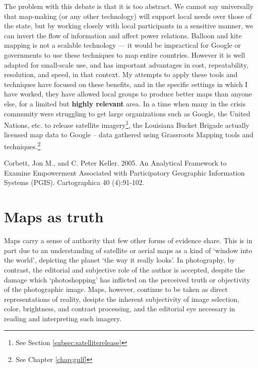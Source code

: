 \documentclass[11pt]{report}
\begin{document}
The problem with this debate is that it is too abstract. We cannot say universally that map-making (or any other technology) will support local needs over those of the state, but by working closely with local participants in a sensitive manner, we can invert the flow of information and affect power relations. Balloon and kite mapping is not a scalable technology --- it would be impractical for Google or governments to use these techniques to map entire countries. However it is well adapted for small-scale use, and has important advantages in cost, repeatability, resolution, and speed, in that context. My attempts to apply these tools and techniques have focused on these benefits, and in the specific settings in which I have worked, they have allowed local groups to produce better maps than anyone else, for a limited but \textbf{highly relevant} area. In a time when many in the crisis community were struggling to get large organizations such as Google, the United Nations, etc. to release satellite imagery\footnote{See Section \ref{subsec:satelliterelease}}, the Louisiana Bucket Brigade actually licensed map data to Google -- data gathered using Grassroots Mapping tools and techniques.\footnote{See Chapter \ref{chap:gulf}} 

Corbett, Jon M., and C. Peter Keller. 2005. An Analytical Framework to Examine Empowerment Associated with Participatory Geographic Information Systems (PGIS). Cartographica 40 (4):91-102.

\section{Maps as truth}
\label{sec:truth}

Maps carry a sense of authority that few other forms of evidence share. This is in part due to an understanding of satellite or aerial maps as a kind of `window into the world', depicting the planet `the way it really looks'. In photography, by contrast, the editorial and subjective role of the author is accepted, despite the damage which `photoshopping' has inflicted on the perceived truth or objectivity of the photographic image. Maps, however, continue to be taken as direct representations of reality, desipte the inherent subjectivity of image selection, color, brightness, and contrast processing, and the editorial eye necessary in reading and interpreting such imagery. 
\end{document}
